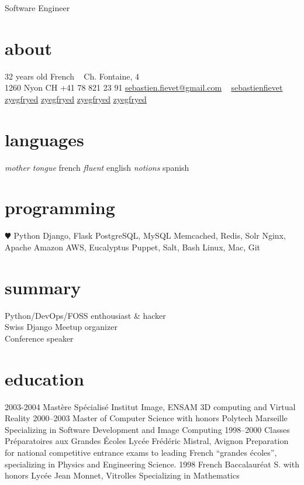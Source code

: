 \documentclass[]{friggeri}
\begin{document}
       {Software Engineer}

\begin{aside}
  \section{about}
    {\FA \faUser} 32 years old
    {\FA \faFlag} French
    ~
    {\FA \faHome} Ch. Fontaine, 4\\1260 Nyon CH
    {\FA \faPhone} +41 78 821 23 91
    {\FA \faEnvelope} \href{mailto:sebastien.fievet@gmail.com}{sebastien.fievet@gmail.com}
    ~
    \href{http://www.linkedin.com/in/sebastienfievet}{{\FA \faLinkedin} sebastienfievet}
    ~
    \href{https://twitter.com/zyegfryed}{{\FA \faTwitter} zyegfryed}
    \href{https://github.com/zyegfryed}{{\FA \faGithub} zyegfryed}
    \href{https://bitbucket.org/zyegfryed}{{\FA \faBeaker} zyegfryed}
    \href{https://speakerdeck.com/zyegfryed}{{\FA \faBullhorn} zyegfryed}
  \section{languages}
    \emph{mother tongue} french
    \emph{fluent} english
    \emph{notions} spanish
  \section{programming}
    {\color{red} $\varheartsuit$} Python
    Django, Flask
    PostgreSQL, MySQL
    Memcached, Redis, Solr
    Nginx, Apache
    Amazon AWS, Eucalyptus
    Puppet, Salt, Bash
    Linux, Mac, Git
\end{aside}

\section{summary}

Python/DevOps/FOSS enthousiast \& hacker\\
Swiss Django Meetup organizer\\
Conference speaker

\section{education}

\begin{entrylist}
  \entry
    {2003-2004}
    {Mastère Spécialisé}
    {Institut Image, ENSAM}
    {3D computing and Virtual Reality}
  \entry
    {2000–2003}
    {Master of Computer Science with honors}
    {Polytech Marseille}
    {Specializing in Software Development and Image Computing}
  \entry
    {1998–2000}
    {Classes Préparatoires aux Grandes Écoles}
    {Lycée Frédéric Mistral, Avignon}
    {Preparation for national competitive entrance exams to leading French ``grandes écoles'', specializing in Physics and Engineering Science.}
  \entry
    {1998}
    {French Baccalauréat S. with honors}
    {Lycée Jean Monnet, Vitrolles}
    {Specializing in Mathematics}
\end{entrylist}
\end{document}
